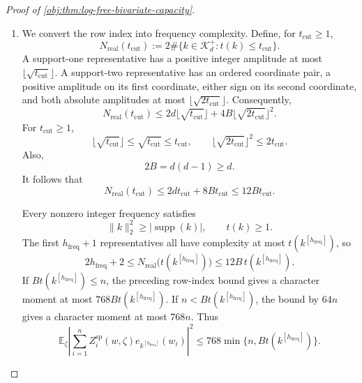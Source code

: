 \documentclass[11pt]{article}
\begin{document}
\begin{proof}[Proof of \cref{obj:thm:log-free-bivariate-capacity}]
\begin{enumerate}
The two real rows associated with \(k^{[h_{\mathrm{freq}}]}\) satisfy the pointwise identity
\[
\left|
\sum_{i=1}^n
Z_i^{\mathrm{sp}}(w,\zeta)
e_{k^{[h_{\mathrm{freq}}]}}(w_i)
\right|^2
=
\frac{
\bigl(a_{2h_{\mathrm{freq}}+1}(w)^{\mathsf T}Z^{\mathrm{sp}}(w,\zeta)\bigr)^2
+
\bigl(a_{2h_{\mathrm{freq}}+2}(w)^{\mathsf T}Z^{\mathrm{sp}}(w,\zeta)\bigr)^2
}{2}.
\]
Indeed, the row imbalances are \(\sqrt2\) times the real and imaginary parts of the character imbalance. Taking expectations therefore gives
\[
\mathbb E_\zeta
\left|
\sum_{i=1}^n
Z_i^{\mathrm{sp}}(w,\zeta)
e_{k^{[h_{\mathrm{freq}}]}}(w_i)
\right|^2
\leq64\min\{2h_{\mathrm{freq}}+2,n\}.
\]

\item
We convert the row index into frequency complexity. Define, for \(t_{\mathrm{cut}}\geq1\),
\[
N_{\mathrm{real}}(t_{\mathrm{cut}})
:=
2\#\{k\in\mathscr K_d^+:t(k)\leq t_{\mathrm{cut}}\}.
\]
A support-one representative has a positive integer amplitude at most
\(\lfloor\sqrt{t_{\mathrm{cut}}}\rfloor\). A support-two representative has an ordered coordinate pair, a positive amplitude on its first coordinate, either sign on its second coordinate, and both absolute amplitudes at most
\(\lfloor\sqrt{2t_{\mathrm{cut}}}\rfloor\). Consequently,
\[
N_{\mathrm{real}}(t_{\mathrm{cut}})
\leq
2d\lfloor\sqrt{t_{\mathrm{cut}}}\rfloor
+
4B\lfloor\sqrt{2t_{\mathrm{cut}}}\rfloor^2.
\]
For \(t_{\mathrm{cut}}\geq1\),
\[
\lfloor\sqrt{t_{\mathrm{cut}}}\rfloor
\leq\sqrt{t_{\mathrm{cut}}}\leq t_{\mathrm{cut}},
\qquad
\lfloor\sqrt{2t_{\mathrm{cut}}}\rfloor^2
\leq2t_{\mathrm{cut}}.
\]
Also,
\[
2B=d(d-1)\geq d.
\]
It follows that
\[
N_{\mathrm{real}}(t_{\mathrm{cut}})
\leq2dt_{\mathrm{cut}}+8Bt_{\mathrm{cut}}
\leq12Bt_{\mathrm{cut}}.
\]

Every nonzero integer frequency satisfies
\[
\|k\|_2^2\geq|\operatorname{supp}(k)|,
\qquad t(k)\geq1.
\]
The first \(h_{\mathrm{freq}}+1\) representatives all have complexity at most
\(t(k^{[h_{\mathrm{freq}}]})\), so
\[
2h_{\mathrm{freq}}+2
\leq
N_{\mathrm{real}}\bigl(t(k^{[h_{\mathrm{freq}}]})\bigr)
\leq12B\,t(k^{[h_{\mathrm{freq}}]}).
\]
If \(Bt(k^{[h_{\mathrm{freq}}]})\leq n\), the preceding row-index bound gives a character moment at most \(768Bt(k^{[h_{\mathrm{freq}}]})\). If
\(n<Bt(k^{[h_{\mathrm{freq}}]})\), the bound by \(64n\) gives a character moment at most \(768n\). Thus
\[
\mathbb E_\zeta
\left|
\sum_{i=1}^n
Z_i^{\mathrm{sp}}(w,\zeta)
e_{k^{[h_{\mathrm{freq}}]}}(w_i)
\right|^2
\leq
768\min\{n,Bt(k^{[h_{\mathrm{freq}}]})\}.
\]


\end{enumerate}
\end{proof}
\end{document}
